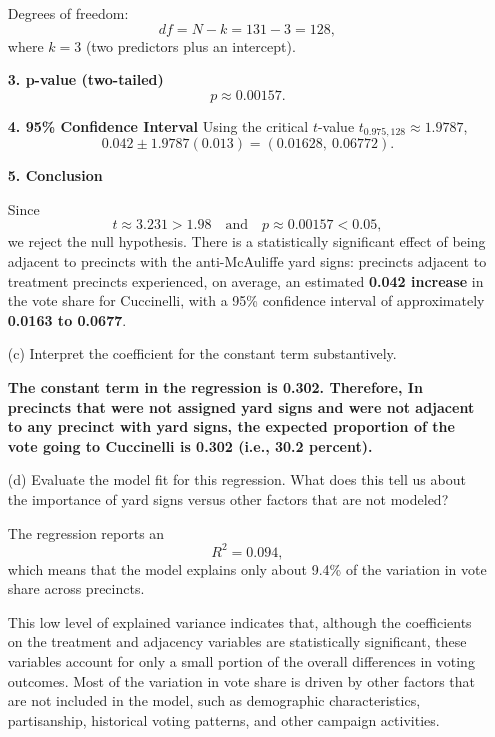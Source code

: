 \documentclass[12pt,letterpaper]{article}
\begin{document}
\begin{enumerate}
	Degrees of freedom:
	\[
	df = N - k = 131 - 3 = 128,
	\]
	where \(k=3\) (two predictors plus an intercept).
	
	\textbf{3. p-value (two-tailed)}
	\[
	p \approx 0.00157.
	\]
	
	\textbf{4. 95\% Confidence Interval}
	Using the critical \(t\)-value \(t_{0.975,128}\approx 1.9787\),
	\[
	0.042 \pm 1.9787(0.013)
	= (0.01628,\ 0.06772).
	\]
	
	\textbf{5. Conclusion}
	
	Since
	\[
	t \approx 3.231 > 1.98 \quad\text{and}\quad p \approx 0.00157 < 0.05,
	\]
	we reject the null hypothesis. There is a statistically significant effect of being adjacent to precincts with the anti-McAuliffe yard signs: precincts adjacent to treatment precincts experienced, on average, an estimated \textbf{0.042 increase} in the vote share for Cuccinelli, with a 95\% confidence interval of approximately \textbf{0.0163 to 0.0677}.
	
	
	\vspace{7cm}
	\item [(c)] Interpret the coefficient for the constant term substantively.
	\vspace{0.1cm}
	
	\textbf{The constant term in the regression is 0.302. Therefore, In precincts that were not assigned yard signs and were not adjacent to any precinct with yard signs, the expected proportion of the vote going to Cuccinelli is 0.302 (i.e., 30.2 percent).}
	
	\item [(d)] Evaluate the model fit for this regression.  What does this	tell us about the importance of yard signs versus other factors that are not modeled?
	
 
 The regression reports an 
  \[
  R^{2} = 0.094,
  \]
  which means that the model explains only about 9.4\% of the variation in vote share across precincts.
  
  This low level of explained variance indicates that, although the coefficients on the treatment and adjacency variables are statistically significant, these variables account for only a small portion of the overall differences in voting outcomes. Most of the variation in vote share is driven by other factors that are not included in the model, such as demographic characteristics, partisanship, historical voting patterns, and other campaign activities.
  
  
	
\end{enumerate}  
\end{document}
